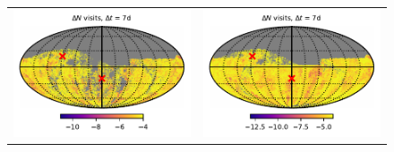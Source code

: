 \documentclass[preprintm,linenumbers]{aastex631}
\begin{document}
\begin{figure}
\begin{tabular}{@{}c@{}c@{}}
         \includegraphics{results/skymaps_cutout/skymaps_cutout_delta_first_year_one_snap_v4_0_10yrs_db_noDD_noTwi_tscale-7_nside-256_doAllTemplateMetrics_reduceCount_g_noDD_noTwi.pdf} &
         \includegraphics{results/skymaps_cutout/skymaps_cutout_delta_first_year_one_snap_v4_0_10yrs_db_noDD_noTwi_tscale-7_nside-256_doAllTemplateMetrics_reduceCount_r_noDD_noTwi.pdf} \\

   \end{tabular}


\end{figure}
\end{document}
